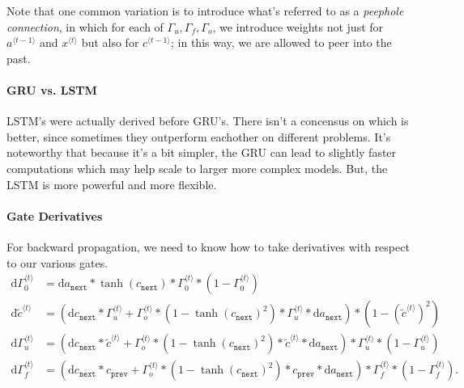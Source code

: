 \documentclass[12pt]{article}
\newcommand{\D}{\mathrm{d}}
\begin{document}
Note that one common variation is to introduce what's referred to as a \emph{peephole connection}, in which for each of $\Gamma_u, \Gamma_f, \Gamma_o$, we introduce weights not just for $a^{\langle t-1 \rangle}$ and $x^{\langle t \rangle}$ but also for $c^{\langle t - 1 \rangle}$; in this way, we are allowed to peer into the past.

\paragraph{GRU vs. LSTM} LSTM's were actually derived before GRU's. There isn't a concensus on which is better, since sometimes they outperform eachother on different problems. It's noteworthy that because it's a bit simpler, the GRU can lead to slightly faster computations which may help scale to larger more complex models. But, the LSTM is more powerful and more flexible.

\paragraph{Gate Derivatives} For backward propagation, we need to know how to take derivatives with respect to our various gates.
\begin{align*}
  \D \Gamma_0^{\langle t \rangle} &= \D a_{\texttt{next}} * \tanh(c_{\texttt{next}}) * \Gamma_0^{\langle t \rangle} * (1 - \Gamma_0^{\langle                                     t \rangle}) \\
  \D \tilde c^{\langle t \rangle} &= \left( \D c_{\texttt{next}} * \Gamma_u^{\langle t \rangle} + \Gamma_o^{\langle t \rangle} * \left(1 - \tanh(c_{\texttt{next}})^2\right)*\Gamma_u^{\langle t \rangle} * \D a_{\texttt{next}}\right) * \left(1 - \left(\tilde c^{\langle t                                     \rangle}\right)^2\right) \\
  \D \Gamma_u^{\langle t \rangle} &= \left( \D c_{\texttt{next}} * \tilde c^{\langle t \rangle} + \Gamma_o^{\langle t \rangle} * \left(1 - \tanh(c_{\texttt{next}})^2\right) * \tilde c^{\langle t \rangle} * \D a_{\texttt{next}}\right) * \Gamma_u^{\langle t \rangle} * \left(1 -                                     \Gamma_u^{\langle t \rangle}\right) \\
  \D \Gamma_f^{\langle t \rangle} &= \left( \D c_{\texttt{next}} * c_{\texttt{prev}} + \Gamma_o^{\langle t \rangle} * \left(1 - \tanh(c_{\texttt{next}})^2\right)*c_{\texttt{prev}}*\D a_{\texttt{next}}\right)*\Gamma_f^{\langle t \rangle} * \left(1 - \Gamma_f^{\langle t \rangle}\right).
\end{align*}
\end{document}
